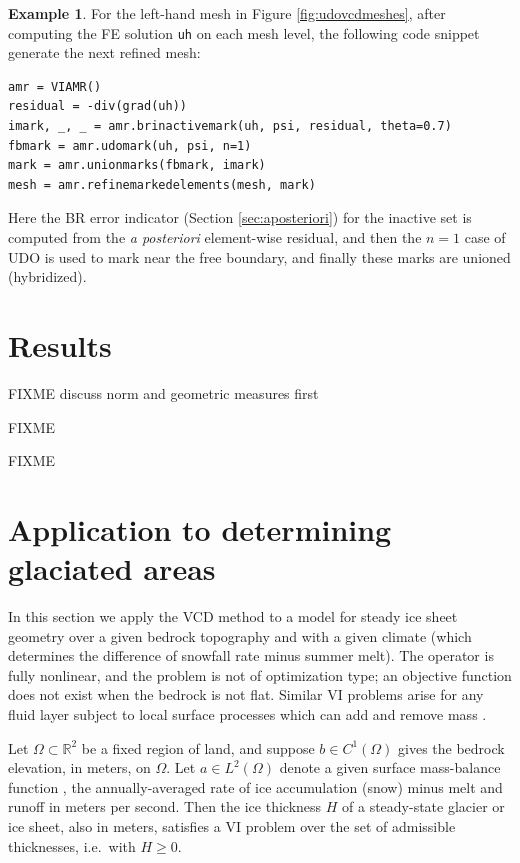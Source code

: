 \documentclass[]{interact}
\theoremstyle{plain}%
\theoremstyle{definition}
\newtheorem{example}[theorem]{Example}
\theoremstyle{remark}
\newcommand{\RR}{\mathbb{R}}
\begin{document}
\begin{example} \label{example:hybrid}
For the left-hand mesh in Figure \ref{fig:udovcdmeshes}, after computing the FE solution \texttt{uh} on each mesh level, the following code snippet generate the next refined mesh:
\begin{verbatim}
amr = VIAMR()
residual = -div(grad(uh))
imark, _, _ = amr.brinactivemark(uh, psi, residual, theta=0.7)
fbmark = amr.udomark(uh, psi, n=1)
mark = amr.unionmarks(fbmark, imark)
mesh = amr.refinemarkedelements(mesh, mark)
\end{verbatim}
Here the BR error indicator (Section \ref{sec:aposteriori}) for the inactive set is computed from the \emph{a posteriori} element-wise residual, and then the $n=1$ case of UDO is used to mark near the free boundary, and finally these marks are unioned (hybridized).
\end{example}



\section{Results} \label{sec:results}

FIXME discuss norm and geometric measures first

FIXME \cite{Kosub2016} \cite{JungeblutKleistMiltzow2022}

FIXME


\section{Application to determining glaciated areas} \label{sec:app}

In this section we apply the VCD method to a model for steady ice sheet geometry over a given bedrock topography and with a given climate (which determines the difference of snowfall rate minus summer melt).  The operator is fully nonlinear, and the problem is not of optimization type; an objective function does not exist when the bedrock is not flat.  Similar VI problems arise for any fluid layer subject to local surface processes which can add and remove mass \cite{Bueler2021b}.

Let $\Omega \subset \RR^2$ be a fixed region of land, and suppose $b \in C^1(\Omega)$ gives the bedrock elevation, in meters, on $\Omega$.  Let $a \in L^2(\Omega)$ denote a given surface mass-balance function \cite{GreveBlatter2009}, the annually-averaged rate of ice accumulation (snow) minus melt and runoff in meters per second.  Then the ice thickness $H$ of a steady-state glacier or ice sheet, also in meters, satisfies a VI problem over the set of admissible thicknesses, i.e.~with $H\ge 0$.
\end{document}
